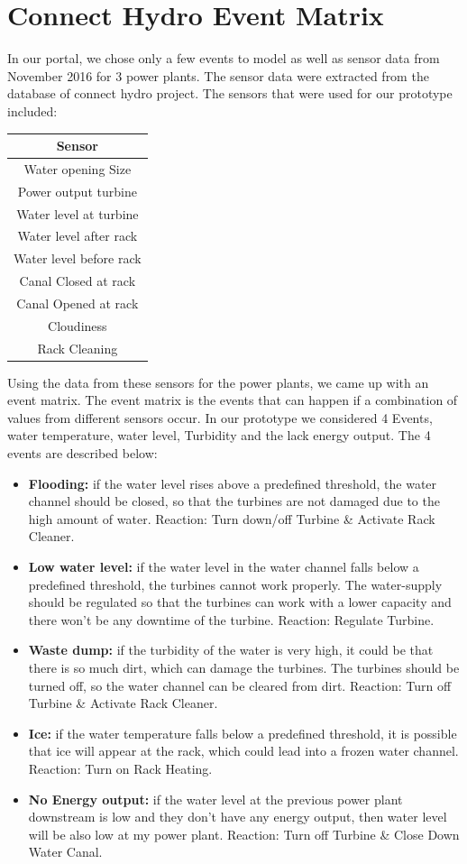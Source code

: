 \section{Connect Hydro Event Matrix}
In our portal, we chose only a few events to model as well as sensor data from November 2016 for 3 power plants. The sensor data were extracted from the database of connect hydro project. The sensors that were used for our prototype included:\\
\begin{center}
\begin{tabular}{ |c| } 
 \hline
 Sensor\\ [0.5ex] 
 \hline\hline
Water opening Size\\ 
Power output turbine\\ 
Water level at turbine\\ 
Water level after rack \\ 
Water level before rack\\ 
Canal Closed at rack\\
Canal Opened at rack\\
Cloudiness \\
Rack Cleaning\\
 \hline
\end{tabular}
\end{center}
Using the data from these sensors for the power plants, we came up with an event matrix. The event matrix is the events that can happen if a combination of values from different sensors occur. In our prototype we considered 4 Events, water temperature, water level, Turbidity and the lack energy output. The 4 events are described below:\\
\begin{itemize}
	\item \textbf{Flooding:} if the water level rises above a predefined threshold, the water channel should be closed, so that the turbines are not damaged due to the high amount of water. Reaction: Turn down/off Turbine \& Activate Rack Cleaner.
	\item \textbf{Low water level:} if the water level in the water channel falls below a predefined threshold, the turbines cannot work properly. The water-supply should be regulated so that the turbines can work with a lower capacity and there won't be any downtime of the turbine. Reaction: Regulate Turbine.
	\item \textbf{Waste dump:} if the turbidity of the water is very high, it could be that there is so much dirt, which can damage the turbines. The turbines should be turned off, so the water channel can be cleared from dirt. Reaction: Turn off Turbine \& Activate Rack Cleaner.
	\item \textbf{Ice:} if the water temperature falls below a predefined threshold, it is possible that ice will appear at the rack, which could lead into a frozen water channel. Reaction: Turn on Rack Heating.
	\item \textbf{No Energy output:} if the water level at the previous power plant downstream is low and they don't have any energy output, then water level will be also low at my power plant. Reaction: Turn off Turbine \& Close Down Water Canal.
	\end{itemize}

